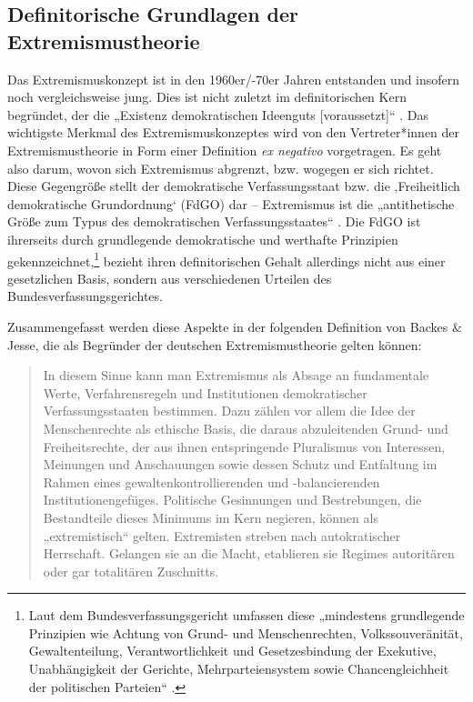 \subsection{Definitorische Grundlagen der Extremismustheorie}\label{definitorische-grundlagen-der-extremismustheorie}

Das Extremismuskonzept ist in den 1960er/-70er Jahren entstanden und insofern noch vergleichsweise jung. Dies ist nicht zuletzt im definitorischen Kern begründet, der die „Existenz demokratischen Ideenguts {[}voraussetzt{]}`` \autocite[15]{kailitzPolitischerExtremismusBundesrepublik2004}. Das wichtigste Merkmal des Extremismuskonzeptes wird von den Vertreter*innen der Extremismustheorie in Form einer Definition \emph{ex negativo} vorgetragen. Es geht also darum, wovon sich Extremismus abgrenzt, bzw. wogegen er sich richtet. Diese Gegengröße stellt der demokratische Verfassungsstaat bzw. die ‚Freiheitlich demokratische Grundordnung` (FdGO) dar -- Extremismus ist die „antithetische Größe zum Typus des demokratischen Verfassungsstaates`` \autocite[328]{backesPolitischerExtremismusDemokratischen1989}. Die FdGO ist ihrerseits durch grundlegende demokratische und werthafte Prinzipien gekennzeichnet,\footnote{Laut dem Bundesverfassungsgericht umfassen diese „mindestens grundlegende Prinzipien wie Achtung von Grund- und Menschenrechten, Volkssouveränität, Gewaltenteilung, Verantwortlichkeit und Gesetzesbindung der Exekutive, Unabhängigkeit der Gerichte, Mehrparteiensystem sowie Chancengleichheit der politischen Parteien`` \autocite{thielboergerFreiheitlicheDemokratischeGrundordnung2021}.} bezieht ihren definitorischen Gehalt allerdings nicht aus einer gesetzlichen Basis, sondern aus verschiedenen Urteilen des Bundesverfassungsgerichtes.

Zusammengefasst werden diese Aspekte in der folgenden Definition von Backes \& Jesse, die als Begründer der deutschen Extremismustheorie gelten können:

\begin{quote}
In diesem Sinne kann man Extremismus als Absage an fundamentale Werte, Verfahrensregeln und Institutionen demokratischer Verfassungsstaaten bestimmen. Dazu zählen vor allem die Idee der Menschenrechte als ethische Basis, die daraus abzuleitenden Grund- und Freiheitsrechte, der aus ihnen entspringende Pluralismus von Interessen, Meinungen und Anschauungen sowie dessen Schutz und Entfaltung im Rahmen eines gewaltenkontrollierenden und -balancierenden Institutionengefüges. Politische Gesinnungen und Bestrebungen, die Bestandteile dieses Minimums im Kern negieren, können als „extremistisch`` gelten. Extremisten streben nach autokratischer Herrschaft. Gelangen sie an die Macht, etablieren sie Regimes autoritären oder gar totalitären Zuschnitts. \autocite[24]{backesVergleichendeExtremismusforschung2005}
\end{quote}

